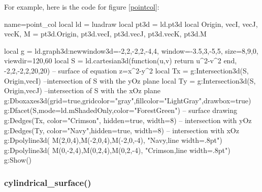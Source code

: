 For example, here is the code for figure \ref{pointcol}:
\begin{Luacode}
\begin{luadraw}{name=point_col}
local ld = luadraw
local pt3d = ld.pt3d
local Origin, vecI, vecJ, vecK, M = pt3d.Origin, pt3d.vecI, pt3d.vecJ, pt3d.vecK, pt3d.M

local g = ld.graph3d:new{window3d={-2,2,-2,2,-4,4}, window={-3.5,3,-5,5}, size={8,9,0}, viewdir={120,60}}
local S = ld.cartesian3d(function(u,v) return u^2-v^2 end, -2,2,-2,2,{20,20}) -- surface of equation z=x^2-y^2
local Tx = g:Intersection3d(S, {Origin,vecI}) --intersection of S with the yOz plane
local Ty = g:Intersection3d(S, {Origin,vecJ}) --intersection of S with the xOz plane
g:Dboxaxes3d({grid=true,gridcolor="gray",fillcolor="LightGray",drawbox=true})
g:Dfacet(S,{mode=ld.mShadedOnly,color="ForestGreen"}) -- surface drawing
g:Dedges(Tx, {color="Crimson", hidden=true, width=8}) -- intersection with yOz
g:Dedges(Ty, {color="Navy",hidden=true, width=8}) -- intersection with xOz
g:Dpolyline3d( {M(2,0,4),M(-2,0,4),M(-2,0,-4)}, "Navy,line width=.8pt")
g:Dpolyline3d( {M(0,-2,4),M(0,2,4),M(0,2,-4)}, "Crimson,line width=.8pt")
g:Show()
\end{luadraw}
\end{Luacode}

\subsubsection{cylindrical\_surface()}

